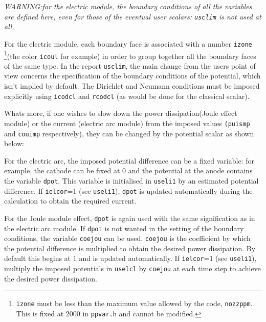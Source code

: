 {{{{\em WARNING:for the electric module, the boundary conditions of all
 the variables are defined here,
even for those of the eventual user scalars: {\em \texttt{usclim}} is not
used at all.}

For the electric module, each boundary face is associated with a number
 \texttt{izone} \footnote{\texttt{izone} must be less than the maximum
 value allowed by the code, \texttt{nozzppm}. This is fixed at 2000 in \texttt
{ppvar.h} and cannot be modified.}(the color \texttt{icoul} for example) in
 order to group together all the boundary faces of the same type. In the report
 \texttt{usclim}, the main change from the users point of view concerns the
 specification of the boundary conditions of the potential, which isn't
 implied by default. The Dirichlet and Neumann conditions must be imposed
 explicitly using \texttt{icodcl} and \texttt{rcodcl} (as would be done for
 the classical scalar).

Whats more, if one wishes to slow down the power dissipation(Joule
effect module) or the current (electric arc module) from the imposed values
\texttt{(puismp} and \texttt{couimp} respectively),
 they can be changed by the potential scalar as shown below:

\begin{list}{-}{}
\item For the electric arc, the imposed potential difference can be a fixed variable:
 for example, the cathode can be fixed at 0 and the potential at the anode
 contains the variable \texttt{dpot}. This variable is initialised in \texttt{useli1}
 by an estimated potential difference. If \texttt{ielcor}=1 (see
 \texttt{useli1}), \texttt{dpot} is updated automatically during the
 calculation to obtain the required current.
\item For the Joule module effect, \texttt{dpot} is again used with the same
 signification as in the electric arc module. If \texttt{dpot} is not wanted
 in the setting of the boundary conditions, the variable \texttt{coejou} can be
 used. \texttt{coejou} is the coefficient by which the potential difference is
 multiplied to obtain the desired power dissipation. By default this begins at
 1 and is updated automatically. If \texttt{ielcor}=1 (see \texttt
{useli1}), multiply the imposed potentials in \texttt{uselcl} by \texttt{coejou}
 at each time step to achieve the desired power dissipation.
 \end{list}

}}}
